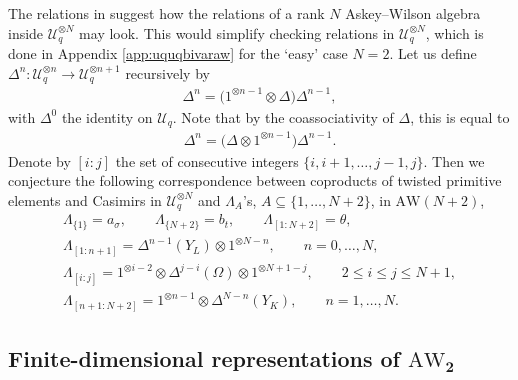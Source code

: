 \documentclass[pdftex]{sigma}
\numberwithin{equation}{section}
\newcommand{\AW}[1]{\mathrm{AW}_{#1}}
\newcommand{\tensor}[1]{^{\otimes{#1}}}
\newcommand{\Uq}{\mathcal{U}_q}
\begin{document}
\begin{Remark}
	The relations in \cite{DeBie2020} suggest how the relations of a rank $N$ Askey--Wilson algebra inside $\Uq^{\otimes N}$ may look. This would simplify checking relations in $\Uq\tensor{N}$, which is done in Appendix \ref{app:uquqbivaraw} for the `easy' case $N=2$. Let us define $\Delta^n\colon \Uq\tensor{n}\to\Uq\tensor{n+1}$ recursively by
	\begin{gather*}
		\Delta^n=\big(1\tensor{n-1}\otimes\Delta\big)\Delta^{n-1},
	\end{gather*}
	with $\Delta^0$ the identity on $\Uq$. Note that by the coassociativity of $\Delta$, this is equal to
	\begin{gather*}
		\Delta^n=\big(\Delta\otimes 1\tensor{n-1}\big)\Delta^{n-1}.
	\end{gather*}
	Denote by $[i:j]$ the set of consecutive integers $\{i,i+1,\dots,j-1,j\}$. Then we conjecture the following correspondence between coproducts of twisted primitive elements and Casimirs in $\Uq\tensor{N}$ and $\Lambda_A$'s, $A\subseteq \{1,\dots,N+2\}$, in $\mathrm{AW}(N+2)$,
	\begin{gather*}
		\Lambda_{\{1\}}=a_\sigma,\qquad \Lambda_{\{N+2\}}=b_t,\qquad \Lambda_{[1:N+2]}=\theta,\\
		\Lambda_{[1:n+1]}=\Delta^{n-1}(Y_L)\otimes 1\tensor{N-n},\qquad n=0,\dots,N,\\
		\Lambda_{[i:j]}=1\tensor{i-2}\otimes \Delta^{j-i}(\Omega)\otimes 1\tensor{N+1-j},\qquad 2\leq i \leq j\leq N+1,\\
		\Lambda_{[n+1:N+2]}=1\tensor{n-1}\otimes \Delta^{N-n}(Y_K),\qquad n=1,\dots,N.
	\end{gather*}
\end{Remark}

\subsection[Finite-dimensional representations of AW\_2]{Finite-dimensional representations of $\boldsymbol{\AW{2}}$}
\end{document}
